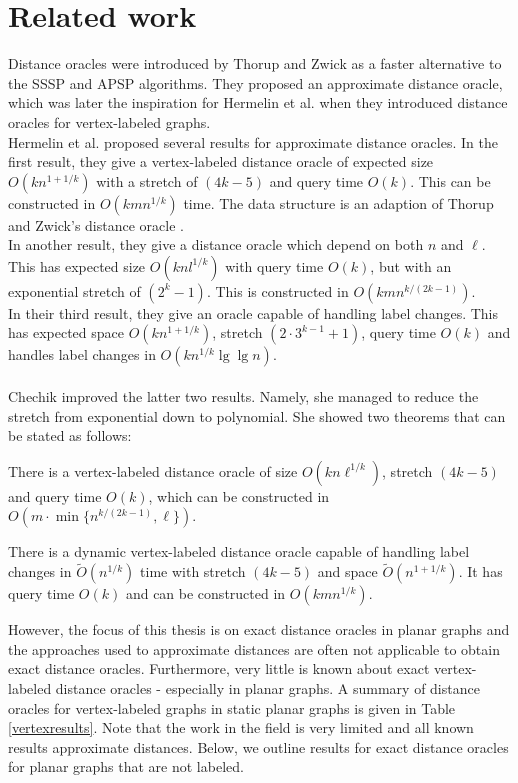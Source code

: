 \section{Related work}\label{survey}
Distance oracles were introduced by Thorup and Zwick \cite{thorup2005approximate} as a
faster alternative to the SSSP and APSP algorithms. They proposed an approximate distance
oracle, which was later the inspiration for Hermelin et al. when they introduced distance
oracles for vertex-labeled graphs. \\
Hermelin et al. \cite{hermelin2011distance} proposed several results for approximate
distance oracles. In the first result, they give a vertex-labeled distance oracle of
expected size $O(kn^{1+1/k})$ with a stretch of $(4k-5)$ and query time $O(k)$. This can
be constructed in $O(kmn^{1/k})$ time. The data structure is an adaption of Thorup and
Zwick's distance oracle \cite{thorup2005approximate}. \\
In another result, they give a distance oracle which depend on both $n$ and $\ell$. This has
expected size $O(knl^{1/k})$ with query time $O(k)$, but with an exponential stretch of
$(2^k-1)$. This is constructed in $O(kmn^{k/(2k-1)})$. \\
In their third result, they give an oracle capable of handling label changes. This has
expected space $O(kn^{1+1/k})$, stretch $(2\cdot3^{k-1}+1)$, query time $O(k)$ and
handles label changes in $O(kn^{1/k}\lg \lg n)$. \\
\\
Chechik \cite{chechik2012improved} improved the latter two results. Namely, she managed to
reduce the stretch from exponential down to polynomial. She showed two theorems that can
be stated as follows:
\begin{thm}\label{chech1}
  There is a vertex-labeled distance oracle
of size $O(kn\ell^{1/k})$, stretch $(4k-5)$  and query time $O(k)$, which can be
constructed in $O(m\cdot \min\{n^{k/(2k-1)}, \ell\})$.
\end{thm}
\begin{thm}\label{chech2}
  There is a dynamic vertex-labeled distance oracle capable of handling label changes in
$\tilde{O}(n^{1/k})$ time with stretch $(4k-5)$ and space $\tilde{O}(n^{1+1/k})$. It has
query time $O(k)$ and can be constructed in $O(kmn^{1/k})$.
\end{thm}
\noindent
However, the focus of this thesis is on exact distance oracles in planar graphs and the approaches used to
approximate distances are often not applicable to obtain exact distance oracles.
Furthermore, very little is known about exact vertex-labeled distance oracles -
especially in planar graphs. A summary of distance oracles for vertex-labeled graphs in static planar graphs is given in Table
\ref{vertexresults}. Note that the work in the field is very limited and all known
results approximate distances. Below, we outline results for exact distance oracles for planar graphs that are not labeled.

